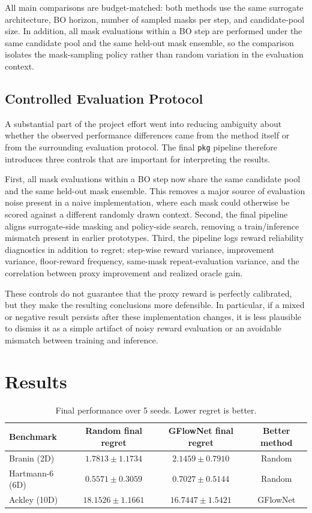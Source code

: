 \documentclass{article}
\begin{document}
All main comparisons are budget-matched: both methods use the same surrogate architecture, BO horizon, number of sampled masks per step, and candidate-pool size. In addition, all mask evaluations within a BO step are performed under the same candidate pool and the same held-out mask ensemble, so the comparison isolates the mask-sampling policy rather than random variation in the evaluation context.

\subsection{Controlled Evaluation Protocol}

A substantial part of the project effort went into reducing ambiguity about whether the observed performance differences came from the method itself or from the surrounding evaluation protocol. The final \texttt{pkg} pipeline therefore introduces three controls that are important for interpreting the results.

First, all mask evaluations within a BO step now share the same candidate pool and the same held-out mask ensemble. This removes a major source of evaluation noise present in a naive implementation, where each mask could otherwise be scored against a different randomly drawn context. Second, the final pipeline aligns surrogate-side masking and policy-side search, removing a train/inference mismatch present in earlier prototypes. Third, the pipeline logs reward reliability diagnostics in addition to regret: step-wise reward variance, improvement variance, floor-reward frequency, same-mask repeat-evaluation variance, and the correlation between proxy improvement and realized oracle gain.

These controls do not guarantee that the proxy reward is perfectly calibrated, but they make the resulting conclusions more defensible. In particular, if a mixed or negative result persists after these implementation changes, it is less plausible to dismiss it as a simple artifact of noisy reward evaluation or an avoidable mismatch between training and inference.

\section{Results}

\begin{table}[t]
\centering
\caption{Final performance over 5 seeds. Lower regret is better.}
\label{tab:final_results}
\small
\begin{tabular}{lccc}
\toprule
Benchmark & Random final regret & GFlowNet final regret & Better method \\
\midrule
Branin (2D) & $1.7813 \pm 1.1734$ & $2.1459 \pm 0.7910$ & Random \\
Hartmann-6 (6D) & $0.5571 \pm 0.3059$ & $0.7027 \pm 0.5144$ & Random \\
Ackley (10D) & $18.1526 \pm 1.1661$ & $16.7447 \pm 1.5421$ & GFlowNet \\
\bottomrule
\end{tabular}
\end{table}
\end{document}
